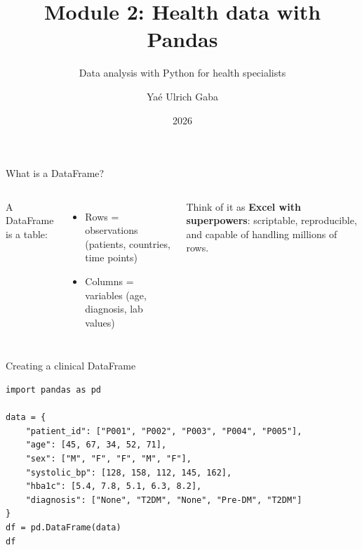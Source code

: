 \documentclass[aspectratio=169,11pt]{beamer}
\title{Module 2: Health data with Pandas}
\subtitle{Data analysis with Python for health specialists}
\author{Yaé Ulrich Gaba}
\institute{AIRINA Labs}
\date{2026}
\begin{document}
\maketitle

\begin{frame}{What is a DataFrame?}
\begin{columns}
A DataFrame is a \alert{table}:
\begin{itemize}
  \item Rows = observations (patients, countries, time points)
  \item Columns = variables (age, diagnosis, lab values)
\end{itemize}

\vspace{6pt}
Think of it as \textbf{Excel with superpowers}: scriptable, reproducible, and capable of handling millions of rows.

\centering
{}
\end{columns}
\end{frame}

\begin{frame}[fragile]{Creating a clinical DataFrame}
\begin{verbatim}
import pandas as pd

data = {
    "patient_id": ["P001", "P002", "P003", "P004", "P005"],
    "age": [45, 67, 34, 52, 71],
    "sex": ["M", "F", "F", "M", "F"],
    "systolic_bp": [128, 158, 112, 145, 162],
    "hba1c": [5.4, 7.8, 5.1, 6.3, 8.2],
    "diagnosis": ["None", "T2DM", "None", "Pre-DM", "T2DM"]
}
df = pd.DataFrame(data)
df
\end{verbatim}
\end{frame}
\end{document}
